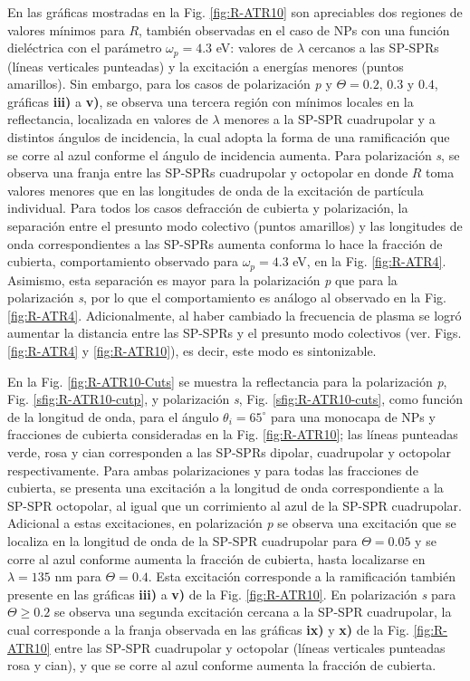	
En las gráficas mostradas en la Fig. \ref{fig:R-ATR10} son apreciables dos regiones de valores mínimos para $R$, también observadas en el caso de NPs con una función dieléctrica con el parámetro $\omega_p=4.3$ eV: valores de $\lambda$ cercanos a las SP-SPRs (líneas verticales punteadas) y la excitación a energías menores (puntos amarillos). Sin embargo, para los casos de polarización \emph{p} y $\Theta = 0.2,\,0.3$ y $0.4$, gráficas \textbf{iii)} a \textbf{v)}, se observa una tercera región con mínimos locales en la reflectancia, localizada en valores de $\lambda$ menores a la SP-SPR cuadrupolar y a distintos ángulos de incidencia, la cual adopta la forma de una ramificación que se corre al azul conforme el ángulo de incidencia aumenta. Para polarización \emph{s}, se observa una franja entre las SP-SPRs cuadrupolar y octopolar en donde $R$ toma valores menores que en las longitudes de onda de la excitación de partícula individual. Para todos los casos defracción de cubierta y polarización, la separación  entre el presunto modo colectivo (puntos amarillos) y las longitudes de onda correspondientes a las SP-SPRs aumenta conforma lo hace la fracción de cubierta, comportamiento observado para $\omega_p = 4.3$ eV, en la Fig.  \ref{fig:R-ATR4}.  Asimismo, esta separación es mayor para la polarización \emph{p} que para la polarización \emph{s}, por lo que el comportamiento es análogo al observado en la Fig. \ref{fig:R-ATR4}. Adicionalmente, al haber cambiado la frecuencia de plasma se logró aumentar la distancia entre las SP-SPRs y el presunto modo colectivos (ver. Figs. \ref{fig:R-ATR4} y \ref{fig:R-ATR10}), es decir, este modo es sintonizable.

En la Fig. \ref{fig:R-ATR10-Cuts} se muestra la reflectancia para la polarización \emph{p}, Fig. \ref{sfig:R-ATR10-cutp}, y polarización \emph{s}, Fig. \ref{sfig:R-ATR10-cuts}, como función de la longitud de onda, para el ángulo $\theta_i = 65^\circ$ para una monocapa de NPs y fracciones de cubierta consideradas en la Fig. \ref{fig:R-ATR10}; las líneas punteadas verde, rosa y cian corresponden a las SP-SPRs dipolar, cuadrupolar y octopolar respectivamente. Para ambas polarizaciones y para todas las fracciones de cubierta, se presenta una excitación a la longitud de onda correspondiente a la SP-SPR octopolar, al igual que un corrimiento al azul de la SP-SPR cuadrupolar. Adicional a estas excitaciones, en polarización \emph{p} se observa una excitación que se localiza en la longitud de onda de la SP-SPR cuadrupolar para $\Theta=0.05$ y se corre al azul conforme aumenta la fracción de cubierta, hasta localizarse en $\lambda= 135$ nm para $\Theta=0.4$. Esta excitación corresponde a la ramificación también presente en las gráficas \textbf{iii)} a \textbf{v)} de la Fig. \ref{fig:R-ATR10}. En polarización \emph{s} para $\Theta\geq 0.2$ se observa una segunda excitación cercana a la SP-SPR cuadrupolar, la cual corresponde a la franja observada en las gráficas \textbf{ix)} y \textbf{x)} de la Fig. \ref{fig:R-ATR10} entre las SP-SPR cuadrupolar y octopolar (líneas verticales punteadas rosa y cian), y que se corre al azul conforme aumenta la fracción de cubierta.

